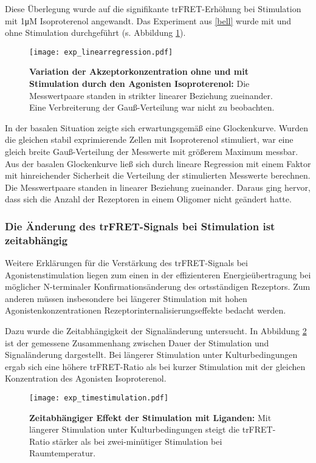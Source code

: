Diese Überlegung wurde auf die signifikante trFRET-Erhöhung bei Stimulation mit 1\si{\micro M} Isoproterenol angewandt. Das Experiment aus \ref{bell} wurde mit und ohne Stimulation durchgeführt (s. Abbildung \ref{fig:linearregression}). 
\begin{figure}[htbp]
	\centering
    \texttt{[image: exp\_linearregression.pdf]}
    \caption{\textbf{Variation der Akzeptorkonzentration ohne und mit Stimulation durch den Agonisten Isoproterenol:} Die Messwertpaare standen in strikter linearer Beziehung zueinander. Eine Verbreiterung der Gauß-Verteilung war nicht zu beobachten.} 
    \label{fig:linearregression}
\end{figure}
In der basalen Situation zeigte sich erwartungsgemäß eine Glockenkurve. Wurden die gleichen stabil exprimierende Zellen mit Isoproterenol stimuliert, war eine gleich breite Gauß-Verteilung der Messwerte mit größerem Maximum messbar. Aus der basalen Glockenkurve ließ sich durch lineare Regression mit einem Faktor mit hinreichender Sicherheit die Verteilung der stimulierten Messwerte berechnen. Die Messwertpaare standen in linearer Beziehung zueinander. Daraus ging hervor, dass sich die Anzahl der Rezeptoren in einem Oligomer nicht geändert hatte.

\subsubsection{Die Änderung des trFRET-Signals bei Stimulation ist zeitabhängig}  
Weitere Erklärungen für die Verstärkung des trFRET-Signals bei Agonistenstimulation liegen zum einen in der effizienteren Energieübertragung bei möglicher N-terminaler Konfirmationsänderung des ortsständigen Rezeptors. Zum anderen müssen insbesondere bei längerer Stimulation mit hohen Agonistenkonzentrationen Rezeptorinternalisierungseffekte bedacht werden.

Dazu wurde die Zeitabhängigkeit der Signaländerung untersucht. In Abbildung \ref{fig:timestimulation} ist der gemessene Zusammenhang zwischen Dauer der Stimulation und Signaländerung dargestellt. Bei längerer Stimulation unter Kulturbedingungen ergab sich eine höhere trFRET-Ratio als bei kurzer Stimulation mit der gleichen Konzentration des Agonisten Isoproterenol.
 
\begin{figure}[htbp]
	\centering
    \texttt{[image: exp\_timestimulation.pdf]}
    \caption{\textbf{Zeitabhängiger Effekt der Stimulation mit Liganden:} Mit längerer Stimulation unter Kulturbedingungen steigt die trFRET-Ratio stärker als bei zwei-minütiger Stimulation bei Raumtemperatur.} 
    \label{fig:timestimulation}
\end{figure}

